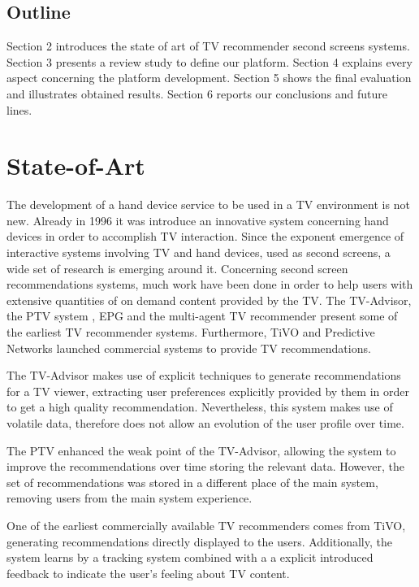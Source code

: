 \documentclass{acm_proc_article-sp}
\begin{document}
\subsection{Outline}

Section 2 introduces the state of art of TV recommender second screens systems. Section 3 presents a review study to define our platform. Section 4 explains every aspect concerning the platform development. Section 5 shows the final evaluation and illustrates obtained results. Section 6 reports our conclusions and future lines.

\section{State-of-Art}

The development of a hand device service to be used in a TV environment is not new. Already in 1996\cite{robertson1996dual} it was introduce an innovative system concerning hand devices in order to accomplish TV interaction. Since the exponent emergence of interactive systems involving TV and hand devices, used as second screens, a wide set of research is emerging around it. Concerning second screen recommendations systems, much work have been done in order to help users with extensive quantities of on demand content provided by the TV. The TV-Advisor\cite{das1998recommender},  the PTV system \cite{cotter2000ptv}, EPG \cite{ardissono2001architecture} and the multi-agent TV recommender\cite{kurapati2001multi} present some of the earliest TV recommender systems. Furthermore, TiVO\cite{ali2004tivo} and Predictive Networks\cite{haibe2012predictive} launched commercial systems to provide TV recommendations. 

The TV-Advisor makes use of explicit techniques to generate recommendations for a TV viewer, extracting user preferences explicitly provided by them in order to get a high quality recommendation. Nevertheless, this system makes use of volatile data, therefore does not allow an evolution of the user profile over time.

The PTV enhanced the weak point of the TV-Advisor, allowing the system to improve the recommendations over time storing the relevant data. However, the set of recommendations was stored in a different place of the main system, removing users from the main system experience. 

One of the earliest commercially available TV recommenders comes from TiVO, generating recommendations directly displayed to the users. Additionally, the system learns by a tracking system combined with a a explicit introduced feedback to indicate the user's feeling about TV content. 
\end{document}
